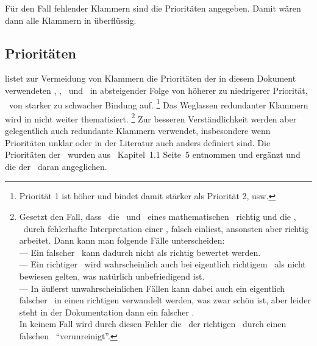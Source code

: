 Für den Fall fehlender Klammern sind die Prioritäten  angegeben.
Damit wären dann alle Klammern in  überflüssig.

\subsection{Prioritäten}%
\label {sub:Prioritaeten}

 listet zur Vermeidung von Klammern die Prioritäten der in diesem Dokument verwendeten \Operationen, \Relationen, \Junktoren\ und \Metadefinitionen\ in absteigender Folge von höherer zu niedrigerer Priorität, \textdh\ von starker zu schwacher Bindung auf.%
\footnote{Priorität 1 ist höher und bindet damit stärker als Priorität 2, usw.}
Das Weglassen redundanter Klammern wird in  nicht weiter thematisiert.%
\footnote{%
	Gesetzt den Fall, dass \ASBA\ die \Praemissen\ und \Konklusionen\ eines mathematischen \Satzes\ richtig und die \Beweisschritte, \textzB\ durch fehlerhafte Interpretation einer \Formel, falsch einliest, ansonsten aber richtig arbeitet.
	Dann kann man folgende Fälle unterscheiden:\\
	--- Ein falscher \Satz\ kann dadurch nicht als richtig bewertet werden.\\
	--- Ein richtiger \Satz\ wird wahrscheinlich auch bei eigentlich richtigem \Beweis\ als nicht bewiesen gelten, was natürlich unbefriedigend ist.\\
	--- In äußerst unwahrscheinlichen Fällen kann dabei auch ein eigentlich falscher \Beweis\ in einen richtigen verwandelt werden, was zwar schön ist, aber leider steht in der Dokumentation dann ein falscher \Beweis.\\
	In keinem Fall wird durch diesen Fehler die \Menge\ der richtigen \Saetze\ durch einen falschen \Satz\ "`verunreinigt"'.
}
Zur besseren Verständlichkeit werden aber gelegentlich auch redundante Klammern verwendet, insbesondere wenn Prioritäten unklar oder in der Literatur auch anders definiert sind.
Die Prioritäten der \Junktoren\ wurden aus~\cite{bib:Rautenberg} Kapitel~1.1 Seite~5 entnommen und ergänzt und die der \Metaoperationen\ daran angeglichen.

